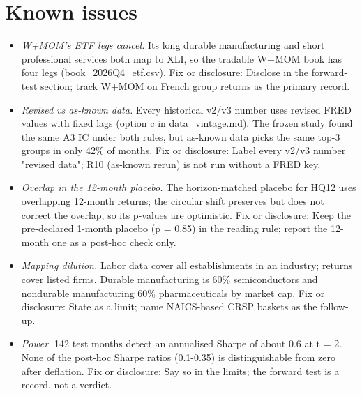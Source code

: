 \section{Known issues}
\begin{itemize}
\item \emph{W+MOM's ETF legs cancel.} Its long durable manufacturing and short professional services both map to XLI, so the tradable W+MOM book has four legs (book\_\allowbreak{}2026Q4\_\allowbreak{}etf.csv). \textcolor{mute}{Fix or disclosure: Disclose in the forward-test section; track W+MOM on French group returns as the primary record.}
\item \emph{Revised vs as-known data.} Every historical v2/\allowbreak{}v3 number uses revised FRED values with fixed lags (option c in data\_\allowbreak{}vintage.md). The frozen study found the same A3 IC under both rules, but as-known data picks the same top-3 groups in only 42\% of months. \textcolor{mute}{Fix or disclosure: Label every v2/\allowbreak{}v3 number "revised data"; R10 (as-known rerun) is not run without a FRED key.}
\item \emph{Overlap in the 12-month placebo.} The horizon-matched placebo for HQ12 uses overlapping 12-month returns; the circular shift preserves but does not correct the overlap, so its p-values are optimistic. \textcolor{mute}{Fix or disclosure: Keep the pre-declared 1-month placebo (p = 0.85) in the reading rule; report the 12-month one as a post-hoc check only.}
\item \emph{Mapping dilution.} Labor data cover all establishments in an industry; returns cover listed firms. Durable manufacturing is 60\% semiconductors and nondurable manufacturing 60\% pharmaceuticals by market cap. \textcolor{mute}{Fix or disclosure: State as a limit; name NAICS-based CRSP baskets as the follow-up.}
\item \emph{Power.} 142 test months detect an annualised Sharpe of about 0.6 at t = 2. None of the post-hoc Sharpe ratios (0.1-0.35) is distinguishable from zero after deflation. \textcolor{mute}{Fix or disclosure: Say so in the limits; the forward test is a record, not a verdict.}
\end{itemize}


